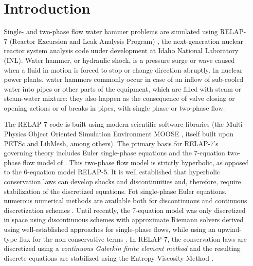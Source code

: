 \documentclass{mc2015}
\begin{document}
\section{Introduction}\label{sec:intro}
%
Single- and two-phase flow water hammer problems are simulated using RELAP-7 (Reactor Excursion and Leak Analysis Program) \cite{Berry_Peterson_2014},
the next-generation nuclear reactor system analysis code under development at Idaho National Laboratory (INL). 
%
Water hammer, or hydraulic shock, is a pressure surge or wave caused when a fluid in motion is forced to stop or change direction abruptly. 
In nuclear power plants, water hammers commonly occur 
in case of an inflow of sub-cooled water into pipes or other parts of the equipment, which are filled with steam or steam-water mixture; they also
happen as the consequence of valve closing or opening actions or of breaks in pipes, with single phase or two-phase flow. 

The RELAP-7 code \cite{Berry_Peterson_2014} is built using modern scientific software libraries (the Multi-Physics Object Oriented Simulation Environment MOOSE \cite{MOOSE}, 
itself built upon PETSc and LibMesh, among others).  
%
The primary basis for RELAP-7's governing theory includes Euler single-phase equations \cite{Toro} and the 7-equation two-phase flow model of \cite{SEM, Berry_MC_2014}. 
This two-phase flow model is strictly hyperbolic, as opposed to the 6-equation model RELAP-5.  
It is well established that hyperbolic conservation laws can develop shocks and discontinuities \cite{Leveque} and, therefore, require stabilization 
of the discretized equations. Fot single-phase Euler equations, numerous numerical methods are available both for discontinuous and continuous discretization schemes 
\cite{Toro, Lapidus_paper, LMP, Lapidus_book, Roe, SUPG}. Until recently, the 7-equation model was only discretized in space using discontinuous schemes with approximate 
Riemann solvers derived using well-established approaches for single-phase flows, while using an upwind-type flux for the non-conservative terms 
\cite{Saurel_2001a, Saurel_2001b, Li_2004, Zein_2010, Ambroso_2012}. 
%
In RELAP-7, the conservation laws are discretized using a \emph{continuous Galerkin finite element method} and the resulting discrete equations are stabilized using 
the Entropy Viscosity Method \cite{jlg1, jlg2}.
 
\end{document}

